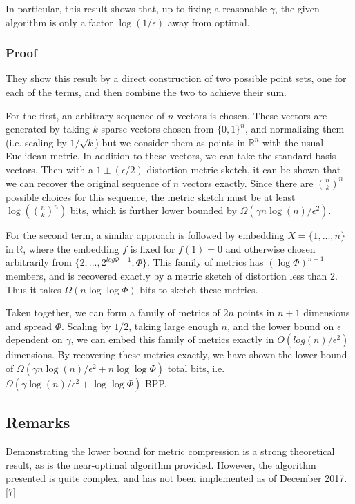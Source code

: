 \documentclass{article}
\begin{document}
In particular, this result shows that, up to fixing a reasonable $\gamma$, the given
algorithm is only a factor $\log (1/\epsilon)$ away from optimal.

\subsubsection{Proof}

They show this result by a direct construction of two possible point sets, one
for each of the terms, and then combine the two to achieve their sum.

For the first, an arbitrary sequence of $n$ vectors is chosen. These vectors are
generated by taking $k$-sparse vectors chosen from $\{0, 1\}^n$, and normalizing
them (i.e. scaling by $1/\sqrt{k}$) but we consider them as points in
$\mathbb{R}^n$ with the usual Euclidean metric. In addition to these vectors, we
can take the standard basis vectors. Then with a $1 \pm (\epsilon/2)$ distortion metric
sketch, it can be shown that we can recover the original sequence of $n$ vectors
exactly. Since there are $\binom{n}{k}^n$ possible choices for this sequence,
the metric sketch must be at least $\log (\binom{n}{k}^n)$ bits, which is
further lower bounded by $\Omega(\gamma n \log(n)/ \epsilon^2)$.

For the second term, a similar approach is followed by embedding $X = \{1, ...,
n\}$ in $\mathbb{R}$, where the embedding $f$ is fixed for $f(1) = 0$ and
otherwise chosen arbitrarily from $\{2, ..., 2^{log \Phi - 1}, \Phi\}$. This family of
metrics has $(\log \Phi)^{n-1}$ members, and is recovered exactly by a metric
sketch of distortion less than 2. Thus it takes $\Omega(n \log \log \Phi)$ bits to
sketch these metrics.

Taken together, we can form a family of metrics of $2n$ points in $n+1$
dimensions and spread $\Phi$. Scaling by $1/2$, taking large enough $n$, and the
lower bound on $\epsilon$ dependent on $\gamma$, we can embed this family of metrics exactly
in $O(log(n)/ \epsilon^2)$ dimensions. By recovering these metrics exactly, we have
shown the lower bound of $\Omega(\gamma n \log(n)/ \epsilon^2 + n \log \log \Phi)$ total bits, i.e.
$\Omega(\gamma \log(n)/\epsilon^2 + \log \log \Phi)$ BPP.

\subsection{Remarks}

Demonstrating the lower bound for metric compression is a strong theoretical
result, as is the near-optimal algorithm provided. However, the algorithm
presented is quite complex, and has not been implemented as of December 2017.
[7]
\end{document}
